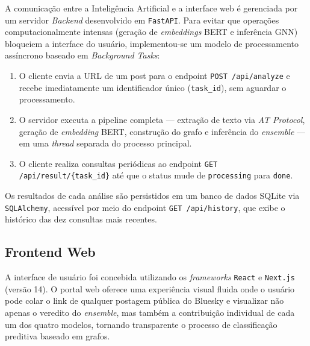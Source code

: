 A comunicação entre a Inteligência Artificial e a interface web é gerenciada por um servidor \textit{Backend} desenvolvido em \texttt{FastAPI}. Para evitar que operações computacionalmente intensas (geração de \textit{embeddings} BERT e inferência GNN) bloqueiem a interface do usuário, implementou-se um modelo de processamento assíncrono baseado em \textit{Background Tasks}:

\begin{enumerate}
    \item O cliente envia a URL de um post para o endpoint \texttt{POST /api/analyze} e recebe imediatamente um identificador único (\texttt{task\_id}), sem aguardar o processamento.
    \item O servidor executa a pipeline completa --- extração de texto via \textit{AT Protocol}, geração de \textit{embedding} BERT, construção do grafo e inferência do \textit{ensemble} --- em uma \textit{thread} separada do processo principal.
    \item O cliente realiza consultas periódicas ao endpoint \texttt{GET /api/result/\{task\_id\}} até que o status mude de \texttt{processing} para \texttt{done}.
\end{enumerate}

Os resultados de cada análise são persistidos em um banco de dados SQLite via \texttt{SQLAlchemy}, acessível por meio do endpoint \texttt{GET /api/history}, que exibe o histórico das dez consultas mais recentes.

\subsection{Frontend Web}

A interface de usuário foi concebida utilizando os \textit{frameworks} \texttt{React} e \texttt{Next.js} (versão 14). O portal web oferece uma experiência visual fluida onde o usuário pode colar o link de qualquer postagem pública do Bluesky e visualizar não apenas o veredito do \textit{ensemble}, mas também a contribuição individual de cada um dos quatro modelos, tornando transparente o processo de classificação preditiva baseado em grafos.
